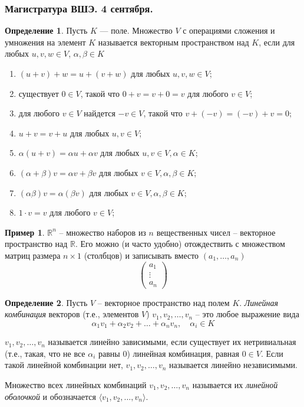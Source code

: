 \documentclass[12pt, fleqn]{extarticle}
\newcommand{\real}{\mathbb{R}}
\theoremstyle{definition}
\newtheorem{definition}{Определение}
\newtheorem*{example}{Пример}
\theoremstyle{remark}
\begin{document}
\clearpage

\thispagestyle{empty}
\subsubsection*{Магистратура ВШЭ. 4 сентября.}

\begin{definition}
Пусть $K$ — поле. Множество $V$ с операциями сложения
и умножения на элемент $K$ называется векторным пространством над $K$, если
для любых $u, v, w \in V$, $\alpha, \beta \in K$
\begin{enumerate}[topsep = 0ex, itemsep = -0.9ex]
\item $(u + v) + w = u + (v + w)$ для любых $u, v, w \in V$;
\item существует $0 \in V$, такой что $0 + v = v + 0 = v$ для любого $v \in V$;
\item для любого $v \in V$ найдется $-v \in V$, такой что $v + (-v) = (-v) + v = 0$;
\item $u + v = v + u$ для любых $u, v \in V$;
\item $\alpha (u + v) = \alpha u + \alpha v$ для любых $u, v \in V, \alpha \in K$;
\item $(\alpha + \beta)v = \alpha v + \beta v$ для любых $v \in V, \alpha, \beta \in K$;
\item $(\alpha\beta)v = \alpha(\beta v)$ для любых $v \in V, \alpha, \beta \in K$;
\item $1 \cdot v = v$ для любого $v \in V$;
\end{enumerate}

\end{definition}

\begin{example}
$\real^{n}$ -- множество наборов из $n$ вещественных чисел -- векторное пространство над $\real$.
Его можно (и часто удобно) отождествить с множеством матриц размера $n \times 1$ (столбцов)
и записывать вместо $(a_{1}, \ldots, a_{n})$
$$\left( \begin{array}{c}
 a_{1}\\
\vdots \\
a_{n} \end{array} \right)
$$
\end{example}


\begin{definition}
Пусть $V$ -- векторное пространство над полем $K$. 
{\it Линейная комбинация} векторов (т.е., элементов $V$) $v_{1}, v_{2}, \ldots, v_{n}$ 
-- это любое выражение вида 
$$\alpha_{1}v_{1} + \alpha_{2}v_{2} + \ldots + \alpha_{n}v_{n}, \quad \alpha_{i} \in K$$

$v_{1}, v_{2}, \ldots, v_{n}$ называется линейно зависимыми, если
существует их нетривиальная (т.е., такая, что не все $\alpha_{i}$ равны 0)
линейная комбинация, равная $0 \in V$. Если  такой линейной комбинации нет,
$v_{1}, v_{2}, \ldots, v_{n}$ называется линейно независимыми.

Множество всех линейных комбинаций $v_{1}, v_{2}, \ldots, v_{n}$ 
называется их {\it линейной оболочкой} и обозначается
$\langle v_{1}, v_{2}, \ldots, v_{n} \rangle$.
\end{definition}
\end{document}
